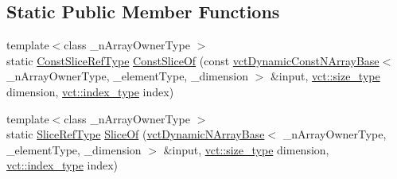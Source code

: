 \subsection*{Static Public Member Functions}
\begin{DoxyCompactItemize}
\item 
{\footnotesize template$<$class \-\_\-n\-Array\-Owner\-Type $>$ }\\static \hyperlink{classvct_dynamic_n_array_types_1_1_slices_types_acf1ea70846d0d2739fce728d3c99bde3}{Const\-Slice\-Ref\-Type} \hyperlink{classvct_dynamic_n_array_types_1_1_slices_types_abe488b76fc50cdd72bfb980b5a16398d}{Const\-Slice\-Of} (const \hyperlink{classvct_dynamic_const_n_array_base}{vct\-Dynamic\-Const\-N\-Array\-Base}$<$ \-\_\-n\-Array\-Owner\-Type, \-\_\-element\-Type, \-\_\-dimension $>$ \&input, \hyperlink{namespacevct_a3e2935e13aac4500965e00d30565775b}{vct\-::size\-\_\-type} dimension, \hyperlink{namespacevct_a50405d87494dce1f22ee3930ca285ee9}{vct\-::index\-\_\-type} index)
\item 
{\footnotesize template$<$class \-\_\-n\-Array\-Owner\-Type $>$ }\\static \hyperlink{classvct_dynamic_n_array_types_1_1_slices_types_a3eac136f0c4ca03f30cf55cdd608ebf8}{Slice\-Ref\-Type} \hyperlink{classvct_dynamic_n_array_types_1_1_slices_types_aacb59f2eecb005e20a53f952ee34f7af}{Slice\-Of} (\hyperlink{classvct_dynamic_n_array_base}{vct\-Dynamic\-N\-Array\-Base}$<$ \-\_\-n\-Array\-Owner\-Type, \-\_\-element\-Type, \-\_\-dimension $>$ \&input, \hyperlink{namespacevct_a3e2935e13aac4500965e00d30565775b}{vct\-::size\-\_\-type} dimension, \hyperlink{namespacevct_a50405d87494dce1f22ee3930ca285ee9}{vct\-::index\-\_\-type} index)
\end{DoxyCompactItemize}


